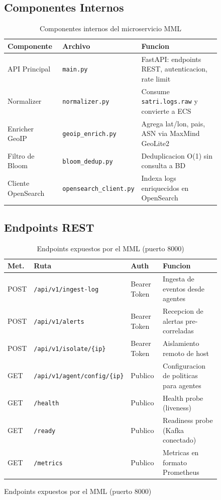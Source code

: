 \documentclass[12pt, a4paper]{report}
\begin{document}
\begin{figure}[htbp]
\subsection{Componentes Internos}

\begin{table}[H]
\centering
\caption{Componentes internos del microservicio MML}
\begin{tabular}{@{}p{3cm}p{4cm}p{6cm}@{}}
\toprule
\textbf{Componente} & \textbf{Archivo} & \textbf{Funcion} \\
\midrule
API Principal    & \texttt{main.py}          & FastAPI: endpoints REST, autenticacion, rate limit \\
Normalizer       & \texttt{normalizer.py}    & Consume \texttt{satri.logs.raw} y convierte a ECS \\
Enricher GeoIP   & \texttt{geoip\_enrich.py} & Agrega lat/lon, pais, ASN via MaxMind GeoLite2 \\
Filtro de Bloom  & \texttt{bloom\_dedup.py}  & Deduplicacion O(1) sin consulta a BD \\
Cliente OpenSearch & \texttt{opensearch\_client.py} & Indexa logs enriquecidos en OpenSearch \\
\bottomrule
\end{tabular}
\end{table}

\subsection{Endpoints REST}

\begin{table}[H]
\centering
\caption{Endpoints expuestos por el MML (puerto 8000)}
\begin{tabular}{@{}p{1cm}p{5cm}p{2.5cm}p{4cm}@{}}
\toprule
\textbf{Met.} & \textbf{Ruta} & \textbf{Auth} & \textbf{Funcion} \\
\midrule
POST & \texttt{/api/v1/ingest-log}          & Bearer Token & Ingesta de eventos desde agentes \\
POST & \texttt{/api/v1/alerts}              & Bearer Token & Recepcion de alertas pre-correladas \\
POST & \texttt{/api/v1/isolate/\{ip\}}      & Bearer Token & Aislamiento remoto de host \\
GET  & \texttt{/api/v1/agent/config/\{ip\}} & Publico      & Configuracion de politicas para agentes \\
GET  & \texttt{/health}                     & Publico      & Health probe (liveness) \\
GET  & \texttt{/ready}                      & Publico      & Readiness probe (Kafka conectado) \\
GET  & \texttt{/metrics}                    & Publico      & Metricas en formato Prometheus \\
\bottomrule
\end{tabular}
\end{table}


\end{figure}
\end{document}
